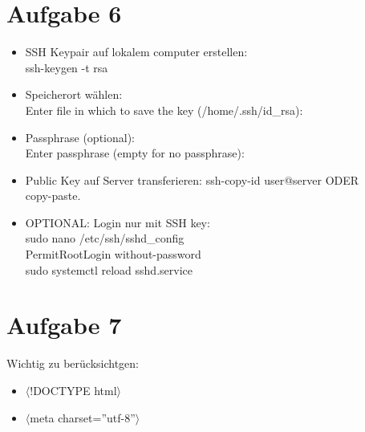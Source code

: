 \documentclass[12pt, a4paper]{report}
\begin{document}
\section*{Aufgabe 6}
\begin{itemize}
	\item SSH Keypair auf lokalem computer erstellen:\\
	ssh-keygen -t rsa
	\item Speicherort wählen:\\
	Enter file in which to save the key (/home/.ssh/id\_rsa):
	\item Passphrase (optional):\\
	Enter passphrase (empty for no passphrase):
	\item Public Key auf Server transferieren:
	ssh-copy-id user@server ODER \\
	copy-paste.
	\item OPTIONAL: Login nur mit SSH key:\\
	sudo nano /etc/ssh/sshd\_config\\
	PermitRootLogin without-password\\
	sudo systemctl reload sshd.service
\end{itemize}

\section*{Aufgabe 7}{\tiny }
Wichtig zu berücksichtgen:
\begin{itemize}
	\item $\langle$!DOCTYPE html$\rangle$
	\item $\langle$meta charset=''utf-8''$\rangle$
\end{itemize}
\end{document}
